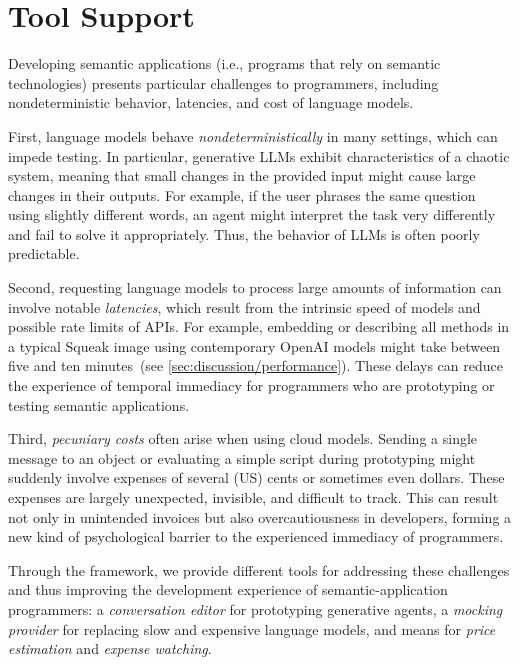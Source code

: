 
\section{Tool Support}
\label{sec:semtex/tools}

Developing semantic applications (i.e., programs that rely on semantic technologies) presents particular challenges to programmers, including nondeterministic behavior, latencies, and cost of language models.

First, language models behave \emph{nondeterministically} in many settings, which can impede testing.
In particular, generative LLMs exhibit characteristics of a chaotic system, meaning that small changes in the provided input might cause large changes in their outputs.
For example, if the user phrases the same question using slightly different words, an agent might interpret the task very differently and fail to solve it appropriately.
Thus, the behavior of LLMs is often poorly predictable.

Second, requesting language models to process large amounts of information can involve notable \emph{latencies}, which result from the intrinsic speed of models and possible rate limits of APIs.
For example, embedding or describing all methods in a typical Squeak image using contemporary OpenAI models might take between five and ten minutes~(see \cref{sec:discussion/performance}).
These delays can reduce the experience of temporal immediacy for programmers who are prototyping or testing semantic applications.

Third, \emph{pecuniary costs} often arise when using cloud models.
Sending a single message to an object or evaluating a simple script during prototyping might suddenly involve expenses of several (US) cents or sometimes even dollars.
These expenses are largely unexpected, invisible, and difficult to track.
This can result not only in unintended invoices but also overcautiousness in developers, forming a new kind of psychological barrier to the experienced immediacy of programmers.

Through the \semtex framework, we provide different tools for addressing these challenges and thus improving the development experience of semantic-application programmers:
a \emph{conversation editor} for prototyping generative agents, a \emph{mocking provider} for replacing slow and expensive language models, and means for \emph{price estimation} and \emph{expense watching}.

